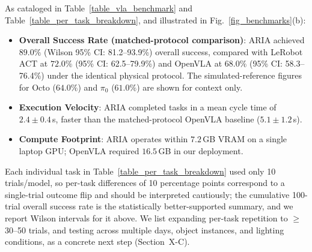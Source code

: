 \documentclass[journal]{IEEEtran}
\begin{document}
As cataloged in Table~\ref{table_vla_benchmark} and Table~\ref{table_per_task_breakdown}, and illustrated in Fig.~\ref{fig_benchmarks}(b):
\begin{itemize}
    \item \textbf{Overall Success Rate (matched-protocol comparison)}: ARIA achieved $89.0\%$ (Wilson 95\% CI: 81.2--93.9\%) overall success, compared with LeRobot ACT at $72.0\%$ (95\% CI: 62.5--79.9\%) and OpenVLA at $68.0\%$ (95\% CI: 58.3--76.4\%) under the identical physical protocol. The simulated-reference figures for Octo ($64.0\%$) and $\pi_0$ ($61.0\%$) are shown for context only.
    \item \textbf{Execution Velocity}: ARIA completed tasks in a mean cycle time of $2.4 \pm 0.4$\,s, faster than the matched-protocol OpenVLA baseline ($5.1 \pm 1.2$\,s).
    \item \textbf{Compute Footprint}: ARIA operates within $7.2$\,GB VRAM on a single laptop GPU; OpenVLA required $16.5$\,GB in our deployment.
\end{itemize}
Each individual task in Table~\ref{table_per_task_breakdown} used only 10 trials/model, so per-task differences of 10 percentage points correspond to a single-trial outcome flip and should be interpreted cautiously; the cumulative 100-trial overall success rate is the statistically better-supported summary, and we report Wilson intervals for it above. We list expanding per-task repetition to $\ge$30--50 trials, and testing across multiple days, object instances, and lighting conditions, as a concrete next step (Section~X-C).
\end{document}
